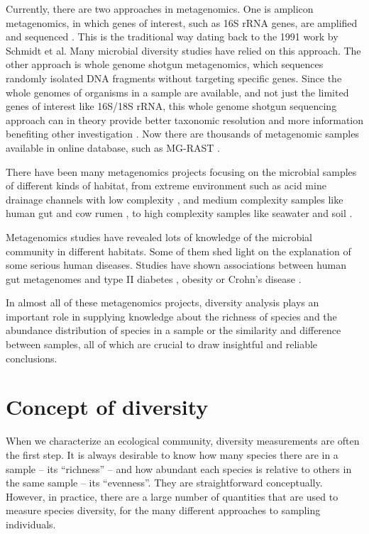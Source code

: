 Currently, there are two approaches in metagenomics. One is amplicon
metagenomics, in which genes of interest, such as 16S rRNA genes, are amplified
and sequenced \cite{Sogin:2006aa}. This is the traditional way dating back to
the 1991 work by Schmidt et al. Many microbial diversity studies have relied on
this approach. The other approach is whole genome shotgun metagenomics, which
sequences randomly isolated DNA fragments without targeting specific genes.
Since the whole genomes of organisms in a sample are available, and not just
the limited genes of interest like 16S/18S rRNA, this whole genome shotgun
sequencing approach can in theory provide better taxonomic resolution and more
information benefiting other investigation \cite{Tyson:2004aa}
\cite{Qin:2010aa}. Now there are thousands of metagenomic samples available in
online database, such as MG-RAST \cite{Glass:2010aa}.

There have been many metagenomics projects focusing on the microbial samples of
different kinds of habitat, from extreme environment such as acid mine drainage
channels with low complexity \cite{Tyson:2004aa}, and medium complexity samples
like human gut \cite{Qin:2010aa} and cow rumen \cite{Hess:2011aa}, to high
complexity samples like seawater \cite{Venter:2004aa} and soil
\cite{Gilbert:2010aa}.

Metagenomics studies have revealed lots of knowledge of the microbial community in
different habitats. Some of them shed light on the explanation of some serious
human diseases. Studies have shown associations between human gut metagenomes
and type II diabetes \cite{Qin:2012aa}, obesity \cite{Turnbaugh:2009aa,
Kau:2011aa} or Crohn's disease \cite{Morgan:2012aa}.

In almost all of these metagenomics projects, diversity analysis plays an
important role in supplying knowledge about the richness of species and the
abundance distribution of species in a sample or the similarity and difference
between samples, all of which are crucial to draw insightful and reliable
conclusions.




\section{Concept of diversity} When we characterize an ecological community,
diversity measurements are often the first step. It is always desirable to know
how many species there are in a sample -- its ``richness'' -- and how abundant
each species is relative to others in the same sample -- its ``evenness''. They
are straightforward conceptually. However, in practice, there are a large number of
quantities that are used to measure species diversity, for the many different
approaches to sampling individuals.

